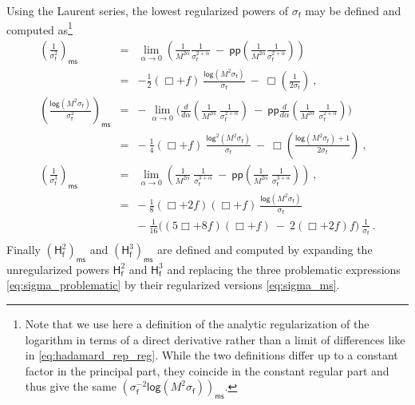 \documentclass[11pt]{book}
\newcommand{\pp}{\mathsf{pp}}
\newcommand{\ms}{\mathsf{ms}}
\renewcommand{\log}{\mathsf{log}}
\newcommand{\Hsf}{\mathsf{H}}
\newcommand{\fsf}{\mathsf{f}}
\theoremstyle{break}
\begin{document}
Using the Laurent series, the lowest regularized powers of $\sigma_\fsf$ may be defined and computed as\footnote{Note that we use here a definition of the analytic regularization of the logarithm in terms of a direct derivative rather than a limit of differences like in \eqref{eq:hadamard_rep_reg}. While the two definitions differ up to a constant factor in the principal part, they coincide in the constant regular part and thus give the same $(\sigma^{-2}_\fsf \log(M^2 \sigma_\fsf))_\ms$.}
%
\begin{eqnarray}
\left(\frac{1}{\sigma_\fsf^2}\right)_\ms &=& \lim_{\alpha\to 0} \left(\frac{1}{M^{2\alpha}} \frac{1}{\sigma^{2+\alpha}_\fsf} \ - \ \pp\left(\frac{1}{M^{2\alpha}} \frac{1}{\sigma^{2+\alpha}_\fsf}\right)\right) \nonumber \\
&=& - \frac12 (\Box+f) \ \frac{\log \left(M^2 \sigma_\fsf\right)}{\sigma_\fsf} \ - \ \Box\left(\frac{1}{2\sigma_\fsf}\right) \ , \nonumber \\
%
\left(\frac{\log\left(M^2\sigma_\fsf\right)}{\sigma_\fsf^2}\right)_\ms &=& - \ \lim_{\alpha\to 0} \Bigg( \frac{d}{d\alpha}\left(\frac{1}{M^{2\alpha}} \ \frac{1}{\sigma^{2+\alpha}_\fsf}\right) \ - \ \pp\frac{d}{d\alpha} \left( \frac{1}{M^{2\alpha}} \ \frac{1}{\sigma^{2+\alpha}_\fsf}\right) \Bigg) \nonumber \\ 
&=& - \ \frac14 \left(\Box+f\right) \ \frac{\log^2\left(M^2 \sigma_\fsf\right)}{\sigma_\fsf} \ - \ \Box\left(\frac{\log \left(M^2 \sigma_\fsf\right)+1}{2\sigma_\fsf}\right) \ , \nonumber \\
%
\left(\frac{1}{\sigma_\fsf^3}\right)_\ms &=& \lim_{\alpha\to 0} \left( \frac{1}{M^{2\alpha}} \ \frac{1}{\sigma^{3+\alpha}_\fsf} \ - \ \pp\left(\frac{1}{M^{2\alpha}} \ \frac{1}{\sigma^{3+\alpha}_\fsf} \right)\right) \ , \nonumber \\
&=& - \ \frac18 (\Box+2f) (\Box+f) \ \frac{\log\left(M^2 \sigma_\fsf\right)}{\sigma_\fsf} \nonumber \\ 
&& - \ \frac{1}{16} \bigg( (5\Box+8f)(\Box+f) \ - \ 2(\Box+2f)f \bigg) \ \frac{1}{\sigma_\fsf} \ . \nonumber \\
\label{eq:sigma_ms}
\end{eqnarray}
%
Finally $\left(\Hsf^2_\fsf\right)_\ms$ and $\left(\Hsf^3_\fsf\right)_\ms$ are defined and computed by expanding the unregularized powers $\Hsf^2_\fsf$ and $\Hsf^3_\fsf$ and replacing the three problematic expressions \eqref{eq:sigma_problematic} by their regularized versions \eqref{eq:sigma_ms}.


\end{document}
